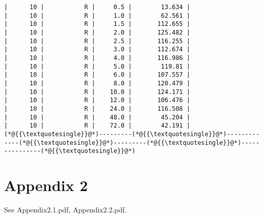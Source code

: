 \documentclass[12pt,a4paper]{article}
\begin{document}
\begin{lstlisting}
|      10 |           R |     0.5 |        13.634 |
|      10 |           R |     1.0 |        62.561 |
|      10 |           R |     1.5 |       112.655 |
|      10 |           R |     2.0 |       125.482 |
|      10 |           R |     2.5 |       116.255 |
|      10 |           R |     3.0 |       112.674 |
|      10 |           R |     4.0 |       116.986 |
|      10 |           R |     5.0 |        119.81 |
|      10 |           R |     6.0 |       107.557 |
|      10 |           R |     8.0 |       120.479 |
|      10 |           R |    10.0 |       124.171 |
|      10 |           R |    12.0 |       106.476 |
|      10 |           R |    24.0 |       116.508 |
|      10 |           R |    48.0 |        45.204 |
|      10 |           R |    72.0 |        42.191 |
(*@{{\textquotesingle}}@*)---------(*@{{\textquotesingle}}@*)-------------(*@{{\textquotesingle}}@*)---------(*@{{\textquotesingle}}@*)---------------(*@{{\textquotesingle}}@*)
\end{lstlisting}


\section{Appendix 2}
See Appendix2.1.pdf, Appendix2.2.pdf.
\end{document}
